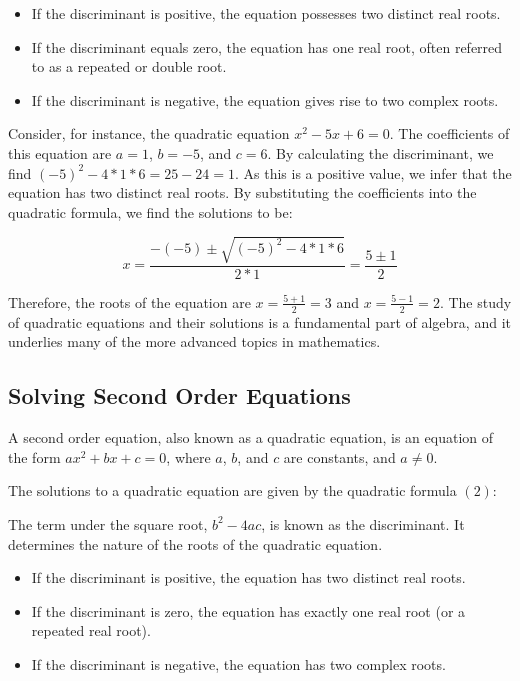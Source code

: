 \documentclass[12pt]{article}
\begin{document}
\begin{itemize}
    \item If the discriminant is positive, the equation possesses two distinct real roots.
    \item If the discriminant equals zero, the equation has one real root, often referred to as a repeated or double root.
    \item If the discriminant is negative, the equation gives rise to two complex roots.
\end{itemize}

Consider, for instance, the quadratic equation $x^2 - 5x + 6 = 0$. The coefficients of this equation are $a=1$, $b=-5$, and $c=6$. By calculating the discriminant, we find $(-5)^2 - 4*1*6 = 25 - 24 = 1$. As this is a positive value, we infer that the equation has two distinct real roots. By substituting the coefficients into the quadratic formula, we find the solutions to be:

\[x = \frac{-(-5) \pm \sqrt{(-5)^2 - 4*1*6}}{2*1} = \frac{5 \pm 1}{2}\]

Therefore, the roots of the equation are $x = \frac{5 + 1}{2} = 3$ and $x = \frac{5 - 1}{2} = 2$. The study of quadratic equations and their solutions is a fundamental part of algebra, and it underlies many of the more advanced topics in mathematics.
\subsection{Solving Second Order Equations}

A second order equation, also known as a quadratic equation, is an equation of the form $ax^2 + bx + c = 0$, where $a$, $b$, and $c$ are constants, and $a \neq 0$. 

The solutions to a quadratic equation are given by the quadratic formula $(2)$:

The term under the square root, $b^2 - 4ac$, is known as the discriminant. It determines the nature of the roots of the quadratic equation.

\begin{itemize}
    \item If the discriminant is positive, the equation has two distinct real roots.
    \item If the discriminant is zero, the equation has exactly one real root (or a repeated real root).
    \item If the discriminant is negative, the equation has two complex roots.
\end{itemize}
\end{document}
